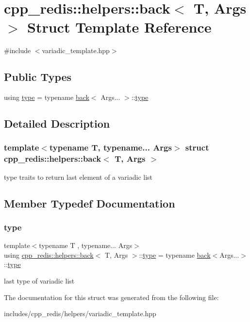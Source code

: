 \hypertarget{structcpp__redis_1_1helpers_1_1back}{}\section{cpp\+\_\+redis\+:\+:helpers\+:\+:back$<$ T, Args $>$ Struct Template Reference}
\label{structcpp__redis_1_1helpers_1_1back}


{\ttfamily \#include $<$variadic\+\_\+template.\+hpp$>$}

\subsection*{Public Types}
\begin{DoxyCompactItemize}
\item 
using \mbox{\hyperlink{structcpp__redis_1_1helpers_1_1back_a83f1d0c03ffc82ff8ab7243c3c858195}{type}} = typename \mbox{\hyperlink{structcpp__redis_1_1helpers_1_1back}{back}}$<$ Args... $>$\+::\mbox{\hyperlink{structcpp__redis_1_1helpers_1_1back_a83f1d0c03ffc82ff8ab7243c3c858195}{type}}
\end{DoxyCompactItemize}


\subsection{Detailed Description}
\subsubsection*{template$<$typename T, typename... Args$>$\newline
struct cpp\+\_\+redis\+::helpers\+::back$<$ T, Args $>$}

type traits to return last element of a variadic list 

\subsection{Member Typedef Documentation}
\mbox{\label{structcpp__redis_1_1helpers_1_1back_a83f1d0c03ffc82ff8ab7243c3c858195}} 
\subsubsection{\texorpdfstring{type}{type}}
{\footnotesize\ttfamily template$<$typename T , typename... Args$>$ \\
using \mbox{\hyperlink{structcpp__redis_1_1helpers_1_1back}{cpp\+\_\+redis\+::helpers\+::back}}$<$ T, Args $>$\+::\mbox{\hyperlink{structcpp__redis_1_1helpers_1_1back_a83f1d0c03ffc82ff8ab7243c3c858195}{type}} =  typename \mbox{\hyperlink{structcpp__redis_1_1helpers_1_1back}{back}}$<$Args...$>$\+::\mbox{\hyperlink{structcpp__redis_1_1helpers_1_1back_a83f1d0c03ffc82ff8ab7243c3c858195}{type}}}

last type of variadic list 

The documentation for this struct was generated from the following file\+:\begin{DoxyCompactItemize}
\item 
includes/cpp\+\_\+redis/helpers/variadic\+\_\+template.\+hpp\end{DoxyCompactItemize}

